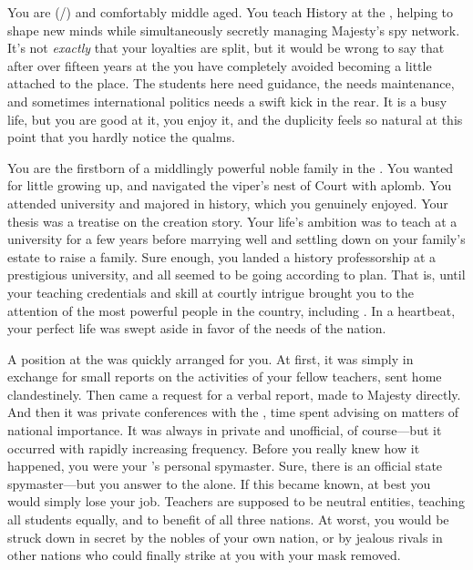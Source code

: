\documentclass[char]{GL2020}
\begin{document}
\name{\cHistory{}}

You are \cHistory{\full} (\cHistory{\they}/\cHistory{\them}) and comfortably middle aged. You teach History at the \pSchool{}, helping to shape new minds while simultaneously secretly managing \cQueen{\Their} Majesty's spy network. It's not \emph{exactly} that your loyalties are split, but it would be wrong to say that after over fifteen years at the \pSchool{} you have completely avoided becoming a little attached to the place. The students here need guidance, the \pSc{} needs maintenance, and sometimes international politics needs a swift kick in the rear. It is a busy life, but you are good at it, you enjoy it, and the duplicity feels so natural at this point that you hardly notice the qualms.

You are the firstborn \cHistory{\child} of a middlingly powerful noble family in the \pFarm{}. You wanted for little growing up, and navigated the viper's nest of Court with aplomb. You attended university and majored in history, which you genuinely enjoyed. Your thesis was a treatise on the creation story. Your life's ambition was to teach at a \pFarm{} university for a few years before marrying well and settling down on your family's estate to raise a family. Sure enough, you landed a history professorship at a prestigious university, and all seemed to be going according to plan. That is, until your teaching credentials and skill at courtly intrigue brought you to the attention of the most powerful people in the country, including \cQueen{\full} \cQueen{\themself}. In a heartbeat, your perfect life was swept aside in favor of the needs of the nation.

A position at the \pSchool{} was quickly arranged for you. At first, it was simply in exchange for small reports on the activities of your fellow teachers, sent home clandestinely. Then came a request for a verbal report, made to \cQueen{\Their} Majesty directly. And then it was private conferences with the \cQueen{\Majesty}, time spent advising \cQueen{\them} on matters of national importance. It was always in private and unofficial, of course---but it occurred with rapidly increasing frequency. Before you really knew how it happened, you were your \cQueen{\Majesty}'s personal spymaster. Sure, there is an official state spymaster---but you answer to the \cQueen{\Majesty} alone. If this became known, at best you would simply lose your job. Teachers are supposed to be neutral entities, teaching all students equally, and to benefit of all three nations. At worst, you would be struck down in secret by the nobles of your own nation, or by jealous rivals in other nations who could finally strike at you with your mask removed.
\end{document}
